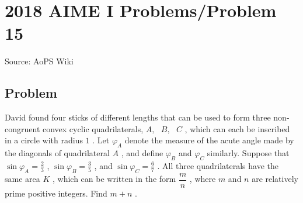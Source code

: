 \documentclass[12pt]{article}
\begin{document}
\section*{{2018 AIME I Problems/Problem 15}}
Source: AoPS Wiki

\subsection*{Problem}
David found four sticks of different lengths that can be used to form three non-congruent convex cyclic quadrilaterals, $A,\text{ }B,\text{ }C$ , which can each be inscribed in a circle with radius $1$ . Let $\varphi_A$ denote the measure of the acute angle made by the diagonals of quadrilateral $A$ , and define $\varphi_B$ and $\varphi_C$ similarly. Suppose that $\sin\varphi_A=\tfrac{2}{3}$ , $\sin\varphi_B=\tfrac{3}{5}$ , and $\sin\varphi_C=\tfrac{6}{7}$ . All three quadrilaterals have the same area $K$ , which can be written in the form $\dfrac{m}{n}$ , where $m$ and $n$ are relatively prime positive integers. Find $m+n$ .
\end{document}
